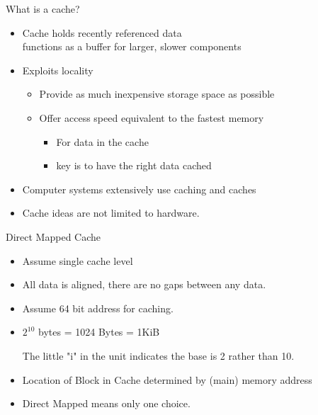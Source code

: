 \documentclass{report}
\begin{document}
\begin{description}
    \item {\large What is a cache?}
        \begin{itemize}
            \item Cache holds recently referenced data\\
                functions as a buffer for larger, slower components
            \item Exploits locality
                \begin{itemize}
                    \item Provide as much inexpensive storage space
                        as possible
                    \item Offer access speed equivalent to the fastest
                        memory
                        \begin{itemize}
                            \item For data in the cache
                            \item key is to have the right data cached
                        \end{itemize}
                \end{itemize}
            \item Computer systems extensively use caching and caches
            \item Cache ideas are not limited to hardware.
        \end{itemize}
        \pagebreak
    \item {\large Direct Mapped Cache}
        \begin{itemize}
            \item Assume single cache level
            \item All data is aligned, there are no gaps between
                any data.
            \item Assume 64 bit address for caching.
            \item $2^{10}$ bytes = 1024 Bytes = 1KiB
                \begin{mdframed}
                    The little "i" in the unit indicates the 
                    base is 2 rather than 10.
                \end{mdframed}
        \end{itemize}
        \hline
        \begin{itemize}
            \item Location of Block in Cache determined by (main)
                memory address
            \item Direct Mapped means only one choice.

\end{itemize}
\end{description}
\end{document}
